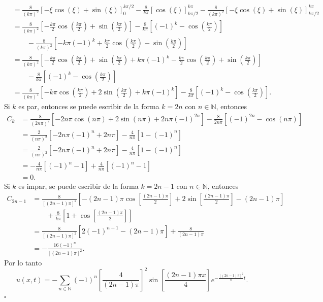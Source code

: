 \documentclass[12pt]{article}
\newcommand{\eej}{\hfill $\square$}
\newcommand{\N}{\mathbb{N}}
\newcommand{\pp}[1]{\left( #1 \right)}
\newcommand{\cc}[1]{\left[ #1 \right]}
\begin{document}
\begin{enumerate}
\begin{enumerate}
\begin{align*}
                &= \frac{8}{(k\pi)^2}\cc{-{\xi}\cos\pp{\xi}+\sin\pp{\xi}}_{0}^{k\pi/2}-\frac{8}{k\pi}\cc{\cos\pp{\xi}}_{k\pi/2}^{k\pi}-\frac{8}{(k\pi)^2}\cc{-{\xi}\cos\pp{\xi}+\sin\pp{\xi}}_{k\pi/2}^{k\pi}\\
                &= \frac{8}{(k\pi)^2}\cc{-\frac{k\pi}{2}\cos\pp{\frac{k\pi}{2}}+\sin\pp{\frac{k\pi}{2}}}
                -\frac{8}{k\pi}\cc{(-1)^k-\cos\pp{\frac{k\pi}{2}}}
                \\&\qquad-\frac{8}{(k\pi)^2}\cc{-{k\pi}(-1)^{k}+\frac{k\pi}{2}\cos\pp{\frac{k\pi}{2}}-\sin\pp{\frac{k\pi}{2}}}\\
                &= \frac{8}{(k\pi)^2}\cc{-\frac{k\pi}{2}\cos\pp{\frac{k\pi}{2}}+\sin\pp{\frac{k\pi}{2}}+{k\pi}(-1)^{k}-\frac{k\pi}{2}\cos\pp{\frac{k\pi}{2}}+\sin\pp{\frac{k\pi}{2}}}
                \\&\qquad-\frac{8}{k\pi}\cc{(-1)^k-\cos\pp{\frac{k\pi}{2}}}\\
                &= \frac{8}{(k\pi)^2}\cc{-k\pi\cos\pp{\frac{k\pi}{2}}+2\sin\pp{\frac{k\pi}{2}}+{k\pi}(-1)^{k}}-\frac{8}{k\pi}\cc{(-1)^k-\cos\pp{\frac{k\pi}{2}}}.
            \end{align*}
            Si $k$ es par, entonces se puede escribir de la forma $k=2n$ con $n\in\N$, entonces
            \begin{align*}
                C_k &= \frac{8}{(2n\pi)^2}\cc{-2n\pi\cos\pp{n\pi}+2\sin\pp{n\pi}+{2n\pi}(-1)^{2n}}-\frac{8}{2n\pi}\cc{(-1)^{2n}-\cos\pp{n\pi}}\\
                &= \frac{2}{(n\pi)^2}\cc{-2n\pi(-1)^{n}+{2n\pi}}-\frac{4}{n\pi}\cc{1-(-1)^n}\\
                &= \frac{2}{(n\pi)^2}\cc{-2n\pi(-1)^{n}+{2n\pi}}-\frac{4}{n\pi}\cc{1-(-1)^n}\\
                &= -\frac{4}{n\pi}\cc{(-1)^{n}-1}+\frac{4}{n\pi}\cc{(-1)^n-1}\\
                &= 0.
            \end{align*}
            Si $k$ es impar, se puede escribir de la forma $k=2n-1$ con $n\in\N$, entonces
            \begin{align*}
                C_{2n-1} &= \frac{8}{[(2n-1)\pi]^2}\cc{-(2n-1)\pi\cos\cc{\frac{(2n-1)\pi}{2}}+2\sin\cc{\frac{(2n-1)\pi}{2}}-{(2n-1)\pi}}\\&\quad\quad+\frac{8}{k\pi}\cc{1+\cos\cc{\frac{(2n-1)\pi}{2}}}\\
                &= \frac{8}{[(2n-1)\pi]^2}\cc{2(-1)^{n+1}-{(2n-1)\pi}}+\frac{8}{(2n-1)\pi}\\
                &= -\frac{16(-1)^{n}}{[(2n-1)\pi]^2}.
            \end{align*}
            Por lo tanto
            \[ u(x,t) = -\sum_{n\in\N}(-1)^{n}\cc{\frac{4}{(2n-1)\pi}}^2\sin\cc{\frac{(2n-1)\pi x}{4}}e^{-\frac{[(2n-1)\pi]^2}{8}t}. \] \eej


\end{enumerate}
\end{enumerate}
\end{document}
